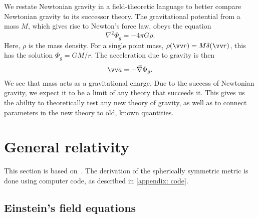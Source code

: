 We restate Newtonian gravity in a field-theoretic language to better compare Newtonian gravity to its successor theory.
The gravitational potential from a mass $M$, which gives rise to Newton's force law, obeys the equation
%
\begin{equation}
    \nabla^2 \Phi_g = - 4 \pi G \rho.
\end{equation}
%
Here, $\rho$ is the mass density.
For a single point mass, $\rho(\vv r) = M \delta(\vv r)$, this has the solution $\Phi_g = G M / r$.
The acceleration due to gravity is then
%
\begin{equation}
    \label{acceleration from Newtonian gravitational potential}
    \vv a = - \vec \nabla \Phi_g.
\end{equation}
%
We see that mass acts as a gravitational charge.
Due to the success of Newtonian gravity, we expect it to be a limit of any theory that succeeds it.
This gives us the ability to theoretically test any new theory of gravity, as well as to connect parameters in the new theory to old, known quantities.



\section{General relativity}
This section is based on~\cite{carrollSpacetimeGeometryIntroduction2019}.
The derivation of the spherically symmetric metric is done using computer code, as described in \autoref{appendix: code}.



\subsection{Einstein's field equations}

